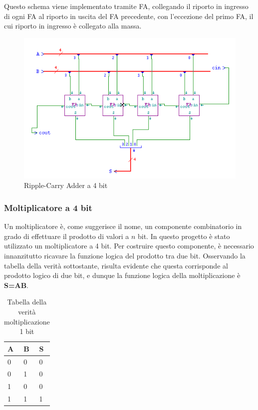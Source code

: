 \documentclass[10pt]{article}
\begin{document}
\begin{itemize}
Questo schema viene implementato tramite FA, collegando il riporto in ingresso di ogni FA al riporto in uscita del FA precedente, con l'eccezione del primo FA, il cui riporto in ingresso è
collegato alla massa.

\begin{figure}[H]
    \begin{minipage}[c]{\textwidth} 
    \centering   
    \includegraphics[width=\textwidth]{RCA}
    \caption{Ripple-Carry Adder a 4 bit}
    \label{ }
    \end{minipage}
\end{figure}


\subsubsection{Moltiplicatore a 4 bit}
Un moltiplicatore è, come suggerisce il nome, un componente combinatorio in grado di effettuare il prodotto di valori a $n$ bit. In questo progetto è stato utilizzato un moltiplicatore a 4 bit.
Per costruire questo componente, è necessario innanzitutto ricavare la funzione logica del prodotto tra due bit. Osservando la tabella della verità sottostante, risulta evidente che questa corrisponde
al prodotto logico di due bit, e dunque la funzione logica della moltiplicazione è \textbf{S=AB}.

\begin{table}[H]
    \begin{minipage}[c]{\textwidth}
    \centering
    \begin{tabular}{|ll|l|}
    \hline
    \textbf{A} & \textbf{B} & \textbf{S} \\ \hline
    0          & 0          & 0          \\ 
    0          & 1          & 0          \\ 
    1          & 0          & 0          \\ 
    1          & 1          & 1          \\ \hline
    \end{tabular}
    \caption{Tabella della verità moltiplicazione 1 bit}
    \label{tab:my-table}
    \end{minipage}
    \end{table}


\end{itemize}
\end{document}
